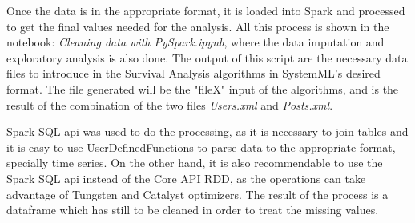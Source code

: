 \documentclass[11pt]{book} %
\begin{document}
    Once the data is in the appropriate format, it is loaded into Spark and processed to get the final values needed for the analysis. All this process is shown in the notebook: \emph{Cleaning data with PySpark.ipynb}, where the data imputation and exploratory analysis is also done. The output of this script are the necessary data files to introduce in the Survival Analysis algorithms in SystemML's desired format. The file generated will be the "fileX" input of the algorithms, and is the result of the combination of the two files \emph{Users.xml} and \emph{Posts.xml}.

    Spark SQL api was used to do the processing, as it is necessary to join tables and it is easy to use UserDefinedFunctions to parse data to the appropriate format, specially time series. On the other hand, it is also recommendable to use the Spark SQL api instead of the Core API RDD, as the operations can take advantage of Tungsten and Catalyst optimizers. The result of the process is a dataframe which has still to be cleaned in order to treat the missing values.

    \begin{table}[!ht]
      \centering
      \caption{Final table format for SystemML algorithm input, extract from the processed file}
      \label{tab:final_table_format}
    \end{table}
\end{document}
